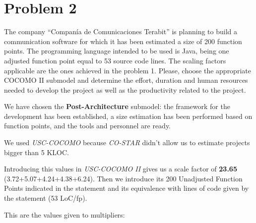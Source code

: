 \section{Problem 2}

The company ``Compan\'ia de Comunicaciones Terabit'' is planning to build a communication software for which it has been estimated a size of 200 function points. The programming language intended to be used is Java, being one adjusted function point equal to 53 source code lines. The scaling factors applicable are the ones achieved in the problem 1. Please, choose the appropriate COCOMO II submodel and determine the effort, duration and human resources needed to develop the project as well as the productivity related to the project.

\seprule

We have chosen the \textbf{Post-Architecture} submodel: the framework for the development has been established, a size estimation has been performed based on function points, and the tools and personnel are ready.

We used \textit{USC-COCOMO} because \textit{CO-STAR} didn't allow us to estimate projects bigger than 5 KLOC.

Introducing this values in \textit{USC-COCOMO II} gives us a scale factor of \textbf{23.65} (3.72+5.07+4.24+4.38+6.24). Then we introduce its 200 Unadjusted Function Points indicated in the statement and its equivalence with lines of code given by the statement (53 LoC/fp).

This are the values given to multipliers:

